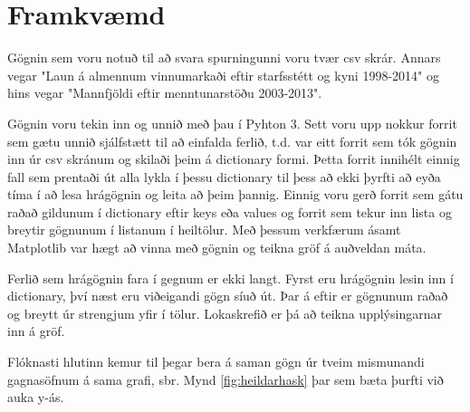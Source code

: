 \documentclass[12pt, git, final]{rureport}
\begin{document}


\section{Framkvæmd}

Gögnin sem voru notuð til að svara spurningunni voru tvær csv skrár. Annars vegar "Laun á almennum vinnumarkaði eftir starfsstétt og kyni 1998-2014"\cite{HG1} og hins vegar "Mannfjöldi eftir menntunarstöðu 2003-2013"\cite{HG2}.

Gögnin voru tekin inn og unnið með þau í Pyhton 3\cite{python3}. Sett voru upp nokkur forrit sem gætu unnið sjálfstætt til að einfalda ferlið, t.d. var eitt forrit sem tók gögnin inn úr csv skránum og skilaði þeim á dictionary formi. Þetta forrit innihélt einnig fall sem prentaði út alla lykla í þessu dictionary til þess að ekki þyrfti að eyða tíma í að lesa hrágögnin og leita að þeim þannig.
Einnig voru gerð forrit sem gátu raðað gildunum í dictionary eftir keys eða values og forrit sem tekur inn lista og breytir gögnunum í listanum í heiltölur. Með þessum verkfærum ásamt Matplotlib\cite{lib} var hægt að vinna með gögnin og teikna gröf á auðveldan máta. 



Ferlið sem hrágögnin fara í gegnum er ekki langt. Fyrst eru hrágögnin lesin inn í dictionary, því næst eru viðeigandi gögn síuð út. Þar á eftir er gögnunum raðað og breytt úr strengjum yfir í tölur. Lokaskrefið er þá að teikna upplýsingarnar inn á gröf.

Flóknasti hlutinn kemur til þegar bera á saman gögn úr tveim mismunandi gagnasöfnum á sama grafi, sbr. Mynd \ref{fig:heildarhask} þar sem bæta þurfti við auka y-ás.
\end{document}

